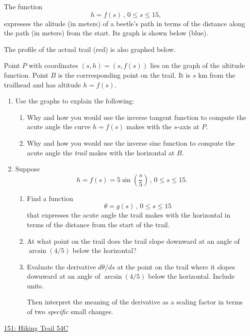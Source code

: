 \documentclass{ximera}
\begin{document}
\begin{question} \label{Qdf3rra}
The function 
\[
 h = f(s) \, , \, 0\leq s \leq 15,
\]
expresses the alitude (in meters) of a beetle's path in terms of the distance along the path (in meters) from the start. Its graph is shown below (blue).

The profile of the actual trail (red) is also graphed below.

Point $P$ with coordinates $(s,h) = (s,f(s))$ lies on the graph of the altitude function. Point $B$ is the corrresponding point on the trail. It is $s$ km from the trailhead and has altitude $h=f(s)$.

\begin{enumerate}

\item Use the graphs to explain the following:
\begin{enumerate}
\item Why and how you would use the inverse tangent function to compute the acute angle the curve $h=f(s)$ makes with the $s$-axis at $P$.

\item Why and how you would use the inverse sine function to compute the acute angle the \emph{trail} makes with the horizontal at $B$.
\end{enumerate}

\begin{freeResponse}
\end{freeResponse}

\item Suppose 
\[
 h = f(s) = 5 \sin \left( \frac{s}{5} \right) \, , \, 0\leq s\leq 15.
\]

\begin{enumerate}
\item Find a function 
\[
   \theta = g(s) \, , \, 0\leq s\leq 15
\]
that expresses the acute angle the trail makes with the horizontal in terms of the distance from the start of the trail. 

\item At what point on the trail does the trail slope downward at an angle of $\arcsin(4/5)$ below the horizontal?

\item Evaluate the derivative $d\theta/ds$ at the point on the trail where it slopes downward at an angle of $\arcsin(4/5)$ below the horizontal. Include units.

Then interpret the meaning of the derivative as a scaling factor in terms of two \emph{specific} small changes.


\end{enumerate}
\end{enumerate}
\begin{onlineOnly}
    \begin{center}
\end{center}
\end{onlineOnly}

\href{https://www.desmos.com/calculator/lktn53d7ju}{151: Hiking Trail 54C}



\end{question}
\end{document}
